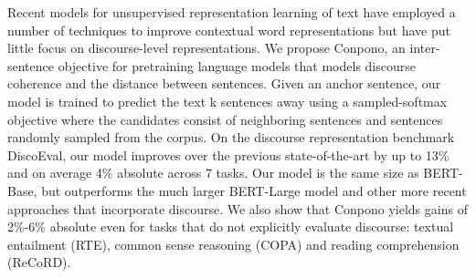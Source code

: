 Recent models for unsupervised representation learning of text have employed a number of techniques to improve contextual word representations but have put little focus on discourse-level representations. We propose Conpono, an inter-sentence objective for pretraining language models that models discourse coherence and the distance between sentences. Given an anchor sentence, our model is trained to predict the text k sentences away using a sampled-softmax objective where the candidates consist of neighboring sentences and sentences randomly sampled from the corpus. On the discourse representation benchmark DiscoEval, our model improves over the previous state-of-the-art by up to 13\% and on average 4\% absolute across 7 tasks. Our model is the same size as BERT-Base, but outperforms the much larger BERT-Large model and other more recent approaches that incorporate discourse. We also show that Conpono yields gains of 2\%-6\% absolute even for tasks that do not explicitly evaluate discourse: textual entailment (RTE), common sense reasoning (COPA) and reading comprehension (ReCoRD).
